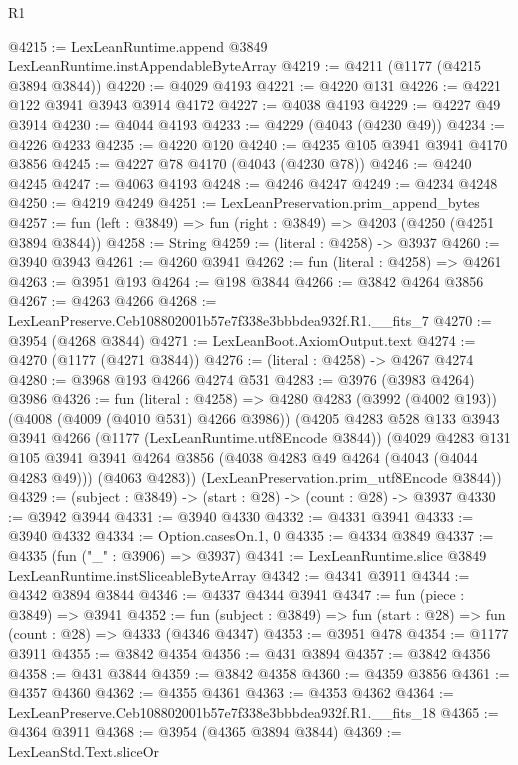 \begin{lexlean}{R1}
\begin{coremodule}
@4215 := LexLeanRuntime.append @3849 LexLeanRuntime.instAppendableByteArray
@4219 := @4211 (@1177 (@4215 @3894 @3844))
@4220 := @4029 @4193
@4221 := @4220 @131
@4226 := @4221 @122 @3941 @3943 @3914 @4172
@4227 := @4038 @4193
@4229 := @4227 @49 @3914
@4230 := @4044 @4193
@4233 := @4229 (@4043 (@4230 @49))
@4234 := @4226 @4233
@4235 := @4220 @120
@4240 := @4235 @105 @3941 @3941 @4170 @3856
@4245 := @4227 @78 @4170 (@4043 (@4230 @78))
@4246 := @4240 @4245
@4247 := @4063 @4193
@4248 := @4246 @4247
@4249 := @4234 @4248
@4250 := @4219 @4249
@4251 := LexLeanPreservation.prim_append_bytes
@4257 := fun (left : @3849) => fun (right : @3849) => @4203 (@4250 (@4251 @3894 @3844))
@4258 := String
@4259 := (literal : @4258) -> @3937
@4260 := @3940 @3943
@4261 := @4260 @3941
@4262 := fun (literal : @4258) => @4261
@4263 := @3951 @193
@4264 := @198 @3844
@4266 := @3842 @4264 @3856
@4267 := @4263 @4266
@4268 := LexLeanPreserve.Ceb108802001b57e7f338e3bbbdea932f.R1.__fits_7
@4270 := @3954 (@4268 @3844)
@4271 := LexLeanBoot.AxiomOutput.text
@4274 := @4270 (@1177 (@4271 @3844))
@4276 := (literal : @4258) -> @4267 @4274
@4280 := @3968 @193 @4266 @4274 @531
@4283 := @3976 (@3983 @4264) @3986
@4326 := fun (literal : @4258) =>
  @4280
    @4283
    (@3992 (@4002 @193))
    (@4008 (@4009 (@4010 @531) @4266 @3986))
    (@4205
      @4283
      @528
      @133
      @3943
      @3941
      @4266
      (@1177 (LexLeanRuntime.utf8Encode @3844))
      (@4029
        @4283
        @131
        @105
        @3941
        @3941
        @4264
        @3856
        (@4038 @4283 @49 @4264 (@4043 (@4044 @4283 @49)))
        (@4063 @4283))
      (LexLeanPreservation.prim_utf8Encode @3844))
@4329 := (subject : @3849) -> (start : @28) -> (count : @28) -> @3937
@4330 := @3942 @3944
@4331 := @3940 @4330
@4332 := @4331 @3941
@4333 := @3940 @4332
@4334 := Option.casesOn.{1, 0}
@4335 := @4334 @3849
@4337 := @4335 (fun ("_" : @3906) => @3937)
@4341 := LexLeanRuntime.slice @3849 LexLeanRuntime.instSliceableByteArray
@4342 := @4341 @3911
@4344 := @4342 @3894 @3844
@4346 := @4337 @4344 @3941
@4347 := fun (piece : @3849) => @3941
@4352 := fun (subject : @3849) => fun (start : @28) => fun (count : @28) => @4333 (@4346 @4347)
@4353 := @3951 @478
@4354 := @1177 @3911
@4355 := @3842 @4354
@4356 := @431 @3894
@4357 := @3842 @4356
@4358 := @431 @3844
@4359 := @3842 @4358
@4360 := @4359 @3856
@4361 := @4357 @4360
@4362 := @4355 @4361
@4363 := @4353 @4362
@4364 := LexLeanPreserve.Ceb108802001b57e7f338e3bbbdea932f.R1.__fits_18
@4365 := @4364 @3911
@4368 := @3954 (@4365 @3894 @3844)
@4369 := LexLeanStd.Text.sliceOr

\end{coremodule}
\end{lexlean}
